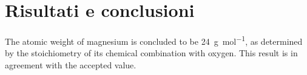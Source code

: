 \documentclass{article}
\begin{document}

\section{Risultati e conclusioni}

The atomic weight of magnesium is concluded to be \SI{24}{\gram\per\mol}, as determined by the stoichiometry of its chemical combination with oxygen. This result is in agreement with the accepted value.







\end{document}
